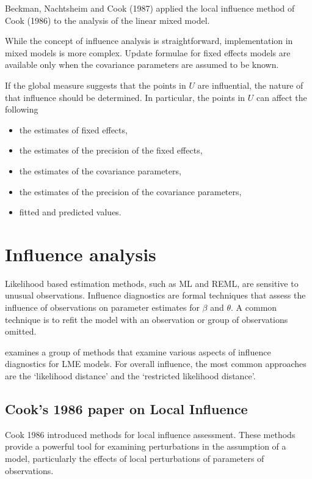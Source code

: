 \documentclass[12pt, a4paper]{article}
\begin{document}
	Beckman, Nachtsheim and Cook (1987) \citet{Beckman} applied the local influence method of Cook (1986) to the analysis of the linear mixed model.
	
	While the concept of influence analysis is straightforward, implementation in mixed models is more complex. Update formulae for fixed effects models are available only when the covariance parameters are assumed to be known.
	
	If the global measure suggests that the points in $U$ are influential, the nature of that influence should be determined. In particular, the points in $U$ can affect the following
	
	\begin{itemize}
		\item the estimates of fixed effects,
		\item the estimates of the precision of the fixed effects,
		\item the estimates of the covariance parameters,
		\item the estimates of the precision of the covariance parameters,
		\item fitted and predicted values.
	\end{itemize}
	
	
	
\newpage
\section{Influence analysis} %

Likelihood based estimation methods, such as ML and REML, are sensitive to unusual observations. Influence diagnostics are formal techniques that assess the influence of observations on parameter estimates for $\beta$ and $\theta$. A common technique is to refit the model with an observation or group of observations omitted.

\citet{west} examines a group of methods that examine various aspects of influence diagnostics for LME models.
For overall influence, the most common approaches are the `likelihood distance' and the `restricted likelihood distance'.

\subsection{Cook's 1986 paper on Local Influence}%
Cook 1986 introduced methods for local influence assessment. These methods provide a powerful tool for examining perturbations in the assumption of a model, particularly the effects of local perturbations of parameters of observations.
\end{document}
